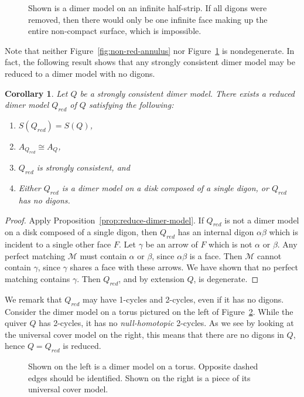 \documentclass{article}
\newtheorem{cor}[thm]{Corollary}
\theoremstyle{definition}
\begin{document}
\def\svgwidth{120pt}
\begin{figure}
	\centering
	
	\caption{Shown is a dimer model on an infinite half-strip. If all digons were removed, then there would only be one infinite face making up the entire non-compact surface, which is impossible.}
	\label{fig:cant-reduce}
\end{figure}

Note that neither Figure~\ref{fig:non-red-annulus} nor Figure~\ref{fig:cant-reduce} is nondegenerate. In fact, the following result shows that any strongly consistent dimer model may be reduced to a dimer model with no digons. 

\begin{cor}\label{cor:degenreduce}
	Let $Q$ be a strongly consistent dimer model. There exists a \textit{reduced dimer model $Q_{red}$ of $Q$} satisfying the following:
	\begin{enumerate}
		\item $S(Q_{red})=S(Q)$,
		\item $A_{Q_{red}}\cong A_Q$,
		\item $Q_{red}$ is strongly consistent, and
		\item Either $Q_{red}$ is a dimer model on a disk composed of a single digon, or $Q_{red}$ has no digons.
	\end{enumerate}
\end{cor}
\begin{proof}
	Apply Proposition~\ref{prop:reduce-dimer-model}. If $Q_{red}$ is not a dimer model on a disk composed of a single digon, then $Q_{red}$ has an internal digon $\alpha\beta$ which is incident to a single other face $F$. Let $\gamma$ be an arrow of $F$ which is not $\alpha$ or $\beta$. Any perfect matching $\mathcal M$ must contain $\alpha$ or $\beta$, since $\alpha\beta$ is a face. Then $\mathcal M$ cannot contain $\gamma$, since $\gamma$ shares a face with these arrows. We have shown that no perfect matching contains $\gamma$. Then $Q_{red}$, and by extension $Q$, is degenerate.
\end{proof}

We remark that $Q_{red}$ may have 1-cycles and 2-cycles, even if it has no digons. Consider the dimer model on a torus pictured on the left of Figure~\ref{fig:dignotdig}. While the quiver $Q$ has 2-cycles, it has no \textit{null-homotopic} 2-cycles. As we see by looking at the universal cover model on the right, this means that there are no digons in $Q$, hence $Q=Q_{red}$ is reduced.

\def\svgwidth{120pt}
\begin{figure}
	\centering
	
	\caption{Shown on the left is a dimer model on a torus. Opposite dashed edges should be identified. Shown on the right is a piece of its universal cover model.}
	\label{fig:dignotdig}
\end{figure}



\end{document}
